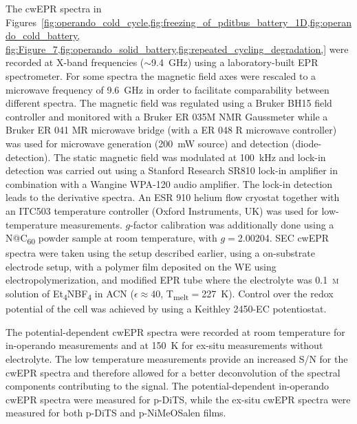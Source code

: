 The cwEPR spectra in Figures~\ref{fig:operando_cold_cycle,fig:freezing_of_pditbus_battery_1D,fig:operando_cold_battery,
fig:Figure_7,fig:operando_solid_battery,fig:repeated_cycling_degradation,} were recorded at X-band frequencies ($\sim$9.4~GHz) using a laboratory-built EPR spectrometer. For some spectra the magnetic field axes were rescaled to a microwave frequency of 9.6~GHz in order to facilitate comparability between different spectra. The magnetic field was regulated using a Bruker BH15 field controller and monitored with a Bruker ER 035M NMR Gaussmeter while a Bruker ER 041 MR microwave bridge (with a ER 048 R microwave controller) was used for microwave generation (200~mW source) and detection (diode-detection). The static magnetic field was modulated at 100~kHz and lock-in detection was carried out using a Stanford Research SR810 lock-in amplifier in combination with a Wangine WPA-120 audio amplifier. The lock-in detection leads to the derivative spectra. An ESR 910 helium flow cryostat together with an ITC503 temperature controller (Oxford Instruments, UK) was used for low-temperature measurements. $g$-factor calibration was additionally done using a N@C\textsubscript{60} powder sample at room temperature, with $g= $2.00204.\cite{si_Wittmann2018_JMagnReson} SEC cwEPR spectra were taken using the setup described earlier, using a on-substrate electrode setup, with a polymer film deposited on the WE using electropolymerization, and modified EPR tube where the electrolyte was 0.1~\textsc{m} solution of Et\textsubscript{4}NBF\textsubscript{4} in ACN ($\epsilon\approx40$, T\textsubscript{melt}$=$227~K). Control over the redox potential of the cell was achieved by using a Keithley 2450-EC potentiostat.\\

\par
The potential-dependent cwEPR spectra were recorded at room temperature for in-operando measurements and at 150~K for ex-situ measurements without electrolyte. The low temperature measurements provide an increased S/N for the cwEPR spectra and therefore allowed for a better deconvolution of the spectral components contributing to the signal. The potential-dependent in-operando cwEPR spectra were measured for p-DiTS, while the ex-situ cwEPR spectra were measured for both p-DiTS and p-NiMeOSalen films.

